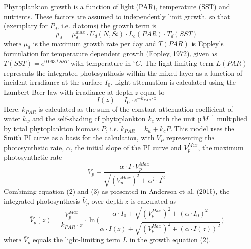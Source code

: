 \documentclass[11pt,letterpaper,english]{article}
\begin{document}
Phytoplankton growth is a function of light (PAR), temperature (SST) and nutrients. These factors are assumed to independently limit growth, so that (exemplary for $P_{d}$, i.e. diatoms) the growth term is
\begin{equation}
\mu_{d} = \mu_{d}^{max} \cdot U_{d}(N,Si)\cdot L_{d}(PAR)\cdot T_{d}(SST)
\end{equation}
where $\mu_{d}$ is the maximum growth rate per day and $T(PAR)$ is Eppley's formulation for temperature dependent growth (Eppley, 1972), given as $T(SST) = e^{0.063 * SST}$ with temperature in $°C$. The light-limiting term $L(PAR)$ represents the integrated photosynthesis within the mixed layer as a function of incident irradiance at the surface $I_0$. Light attenuation is calculated using the Lambert-Beer law with irradiance at depth $z$ equal to
\begin{equation}
I(z) = I_0 \cdot e^{-k_{PAR} \cdot z}
\end{equation}
Here, $k_{PAR}$ is calculated as the sum of the constant attenuation coefficient of water $k_w$ and the self-shading of phytoplankton $k_c$ with the unit $µM^{-1}$ multiplied by total phytoplankton biomass $P$, i.e. $k_{PAR} = k_w + k_c P$. This model uses the Smith PI curve as a basis for the calculation, with $V_P$ representing the photosynthetic rate, $\alpha$, the initial slope of the PI curve and $V_p^{Max}$, the maximum photosynthetic rate
\begin{equation}
V_p = \frac{\alpha \cdot I \cdot V_p^{Max}} {\sqrt{(V_p^{Max})^2 + \alpha^2 \cdot I^2}}
\end{equation}
Combining equation (2) and (3) as presented in Anderson et al. (2015), the integrated photosynthesis $\bar{V}_p$ over depth $z$ is calculated as
\begin{equation}
\bar{V}_p(z) = \frac{V_p^{Max}}{k_{PAR} \cdot z} \cdot \ln \Bigg( \frac{\alpha \cdot I_0 + \sqrt{(V_p^{Max})^2+(\alpha \cdot I_0)^2}} {\alpha \cdot I(z) + \sqrt{(V_p^{Max})^2+(\alpha \cdot I(z))^2}} \Bigg)
\end{equation}
where $\bar{V}_p$ equals the light-limiting term $L$ in the growth equation (2).
\end{document}
